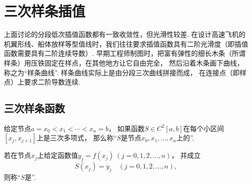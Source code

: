 \section{三次样条插值}
上面讨论的分段低次插值函数都有一致收敛性，但光滑性较差.
在设计高速飞机的机翼形线、船体放样等型值线时，我们往往要求插值函数具有二阶光滑度（即插值函数需要具有二阶连续导数）.
早期工程师制图时，把富有弹性的细长木条（所谓样条）用压铁固定在样点，在其他地方让它自由完全，
然后沿着木条画下曲线，称之为“样条曲线”.
样条曲线实际上是由分段三次曲线拼接而成，
在连接点（即样点）上要求二阶导数连续.

\subsection{三次样条函数}
\begin{definition}
给定节点\(a = x_0 < x_1 < \dotsb < x_n = b\)，
如果函数\(S \in C^2[a,b]\)在每个小区间\([x_j,x_{j+1}]\)上是三次多项式，
那么称“\(S\)是节点\(x_0,x_1,\dotsc,x_n\)上的”.
\end{definition}

\begin{definition}
若在节点\(x_j\)上给定函数值\(y_j = f(x_j)\ (j=0,1,2,\dotsc,n)\)，
并成立\begin{equation*}
	S(x_j) = y_j
	\quad(j=0,1,2,\dotsc,n),
\end{equation*}
则称“\(S\)是”.
\end{definition}
